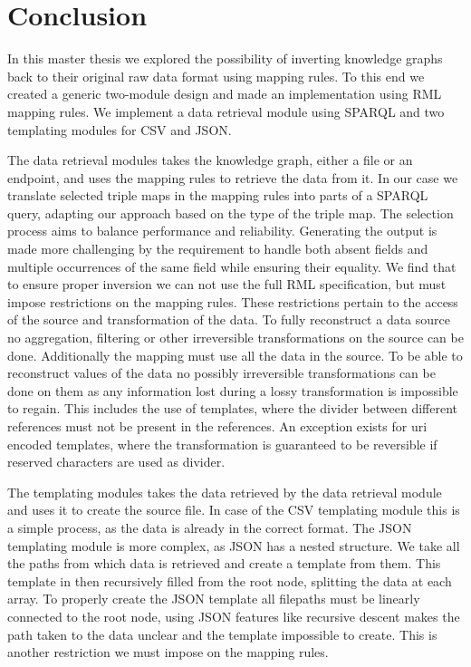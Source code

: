\chapter{Conclusion}
\label{chapter:conclusion}
In this master thesis we explored the possibility of inverting knowledge graphs back to their original raw data format using mapping rules. To this end we created a generic two-module design and made an implementation using RML mapping rules. We implement a data retrieval module using SPARQL and two templating modules for CSV and JSON. 

The data retrieval modules takes the knowledge graph, either a file or an endpoint, and uses the mapping rules to retrieve the data from it. In our case we translate selected triple maps in the mapping rules into parts of a SPARQL query, adapting our approach based on the type of the triple map. The selection process aims to balance performance and reliability. Generating the output is made more challenging by the requirement to handle both absent fields and multiple occurrences of the same field while ensuring their equality. We find that to ensure proper inversion we can not use the full RML specification, but must impose restrictions on the mapping rules. These restrictions pertain to the access of the source and transformation of the data. To fully reconstruct a data source no aggregation, filtering or other irreversible transformations on the source can be done. Additionally the mapping must use all the data in the source. To be able to reconstruct values of the data no possibly irreversible transformations can be done on them as any information lost during a lossy transformation is impossible to regain. This includes the use of templates, where the divider between different references must not be present in the references. An exception exists for uri encoded templates, where the transformation is guaranteed to be reversible if reserved characters are used as divider.

The templating modules takes the data retrieved by the data retrieval module and uses it to create the source file. In case of the CSV templating module this is a simple process, as the data is already in the correct format. The JSON templating module is more complex, as JSON has a nested structure. We take all the paths from which data is retrieved and create a template from them. This template in then recursively filled from the root node, splitting the data at each array. To properly create the JSON template all filepaths must be linearly connected to the root node, using JSON features like recursive descent makes the path taken to the data unclear and the template impossible to create. This is another restriction we must impose on the mapping rules.

